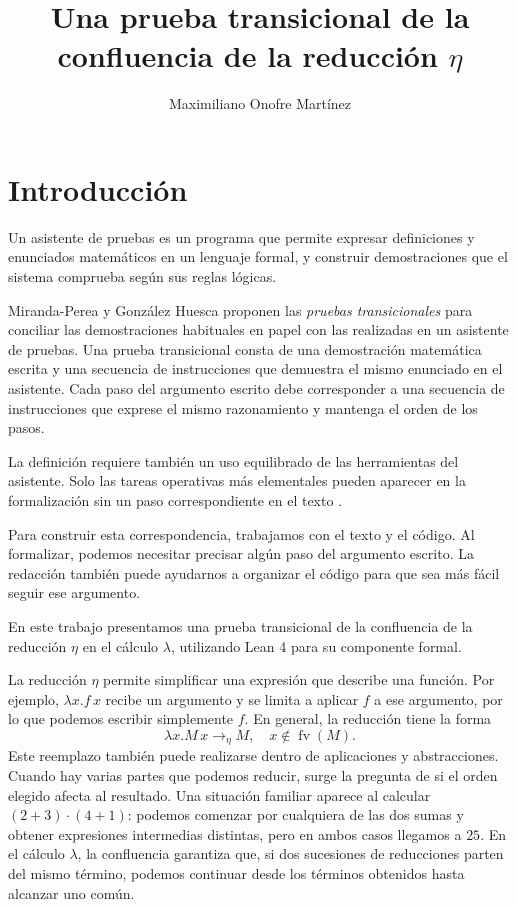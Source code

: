 \documentclass[
  spanish,
  letterpaper,
  DIV=11,
  numbers=noendperiod]{scrreprt}
\title{Una prueba transicional de la confluencia de la reducción
\(\eta\)}
\author{Maximiliano Onofre Martínez}
\date{}
\renewcommand*\contentsname{Tabla de contenidos}
\newcommand\contentsname{Tabla de contenidos}
\theoremstyle{remark}
\begin{document}
\maketitle

\renewcommand*\contentsname{Tabla de contenidos}
{
\setcounter{tocdepth}{1}
\tableofcontents
}


\chapter*{Introducción}\label{introducciuxf3n}



Un asistente de pruebas es un programa que permite expresar definiciones
y enunciados matemáticos en un lenguaje formal, y construir
demostraciones que el sistema comprueba según sus reglas lógicas.

Miranda-Perea y González Huesca proponen las \emph{pruebas
transicionales} para conciliar las demostraciones habituales en papel
con las realizadas en un asistente de pruebas. Una prueba transicional
consta de una demostración matemática escrita y una secuencia de
instrucciones que demuestra el mismo enunciado en el asistente. Cada
paso del argumento escrito debe corresponder a una secuencia de
instrucciones que exprese el mismo razonamiento y mantenga el orden de
los pasos.

La definición requiere también un uso equilibrado de las herramientas
del asistente. Solo las tareas operativas más elementales pueden
aparecer en la formalización sin un paso correspondiente en el texto
\autocite{miranda2022}.

Para construir esta correspondencia, trabajamos con el texto y el
código. Al formalizar, podemos necesitar precisar algún paso del
argumento escrito. La redacción también puede ayudarnos a organizar el
código para que sea más fácil seguir ese argumento.

En este trabajo presentamos una prueba transicional de la confluencia de
la reducción \(\eta\) en el cálculo \(\lambda\), utilizando Lean 4 para
su componente formal.

La reducción \(\eta\) permite simplificar una expresión que describe una
función. Por ejemplo, \(\lambda x. f \, x\) recibe un argumento y se
limita a aplicar \(f\) a ese argumento, por lo que podemos escribir
simplemente \(f\). En general, la reducción tiene la forma \[
\lambda x. M \, x\longrightarrow_\eta M, \quad x\notin\operatorname{fv}(M).
\] Este reemplazo también puede realizarse dentro de aplicaciones y
abstracciones. Cuando hay varias partes que podemos reducir, surge la
pregunta de si el orden elegido afecta al resultado. Una situación
familiar aparece al calcular \((2+3)\cdot(4+1)\): podemos comenzar por
cualquiera de las dos sumas y obtener expresiones intermedias distintas,
pero en ambos casos llegamos a \(25\). En el cálculo \(\lambda\), la
confluencia garantiza que, si dos sucesiones de reducciones parten del
mismo término, podemos continuar desde los términos obtenidos hasta
alcanzar uno común.
\end{document}
